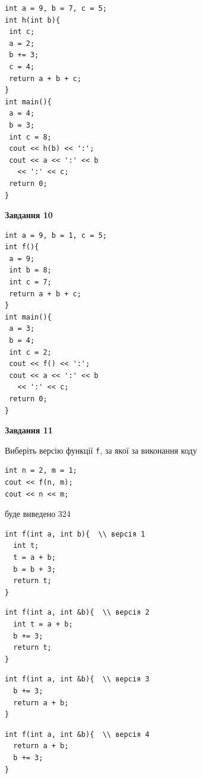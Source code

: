 \documentclass[12pt, ukrainian]{article}
\def\code#1{\Verb!#1!}
\begin{document}
{\begin {large}
\begin{minipage}[t]{7.0cm}
\begin{verbatim}
int a = 9, b = 7, c = 5;
int h(int b){
 int c;
 a = 2;
 b += 3;
 c = 4;
 return a + b + c;
}
int main(){
 a = 4;
 b = 3;
 int c = 8;
 cout << h(b) << ':';
 cout << a << ':' << b 
   << ':' << c;
 return 0;
}
\end{verbatim}



\begin{center}
\textbf{Завдання 10}
\end{center}
\vspace{-8mm}

\begin{verbatim}
int a = 9, b = 1, c = 5;
int f(){
 a = 9;
 int b = 8;
 int c = 7;
 return a + b + c;
}
int main(){
 a = 3;
 b = 4;
 int c = 2;
 cout << f() << ':';
 cout << a << ':' << b 
   << ':' << c;
 return 0;
}
\end{verbatim}

\end{minipage}
\vline \hspace{1mm}
\begin{minipage}[t]{11.0cm}

\begin{center}
\textbf{Завдання 11}
\end{center}
Виберіть версію функції \code{f}, за якої за виконання коду
\begin{verbatim}
int n = 2, m = 1;
cout << f(n, m);
cout << n << m;
\end{verbatim}

буде виведено 324

\begin{verbatim}
int f(int a, int b){  \\ версія 1
  int t;
  t = a + b;
  b = b + 3;
  return t;
}
\end{verbatim}

\vspace{-8mm}\begin{verbatim}
int f(int a, int &b){  \\ версія 2
  int t = a + b;
  b += 3;
  return t;
}
\end{verbatim}

\vspace{-8mm}\begin{verbatim}
int f(int a, int &b){  \\ версія 3
  b += 3;
  return a + b;
}
\end{verbatim}

\vspace{-8mm}\begin{verbatim}
int f(int a, int &b){  \\ версія 4
  return a + b;
  b += 3;
}
\end{verbatim}




\end{minipage}
\end{large}}
\end{document}
